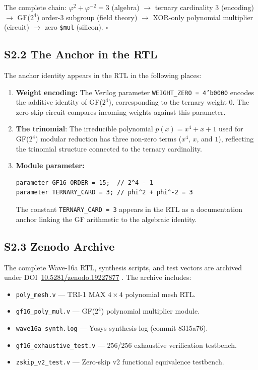 The complete chain: \(\varphi^{2}+\varphi^{-2}=3\) (algebra)
\(\to\) ternary cardinality 3 (encoding) \(\to\) GF(\(2^4\)) order-3 subgroup
(field theory) \(\to\) XOR-only polynomial multiplier (circuit)
\(\to\) zero \texttt{\$mul} (silicon). \(\square\)

\subsection{S2.2 The Anchor in the RTL}

The anchor identity appears in the RTL in the following places:

\begin{enumerate}
  \item \textbf{Weight encoding:} The Verilog parameter
        \texttt{WEIGHT\_ZERO = 4'b0000} encodes the additive identity
        of GF(\(2^4\)), corresponding to the ternary weight 0.
        The zero-skip circuit compares incoming weights against this parameter.

  \item \textbf{The trinomial}: The irreducible polynomial
        \(p(x) = x^4 + x + 1\) used for GF(\(2^4\)) modular reduction
        has three non-zero terms (\(x^4\), \(x\), and \(1\)), reflecting the
        trinomial structure connected to the ternary cardinality.

  \item \textbf{Module parameter:}
\begin{verbatim}
parameter GF16_ORDER = 15;  // 2^4 - 1
parameter TERNARY_CARD = 3; // phi^2 + phi^-2 = 3
\end{verbatim}
        The constant \texttt{TERNARY\_CARD = 3} appears in the RTL as a
        documentation anchor linking the GF arithmetic to the algebraic
        identity.
\end{enumerate}

\subsection{S2.3 Zenodo Archive}

The complete Wave-16a RTL, synthesis scripts, and test vectors are archived
under DOI~\href{https://doi.org/10.5281/zenodo.19227877}{10.5281/zenodo.19227877}
\cite{zenodo_19227877_phd}.
The archive includes:
\begin{itemize}
  \item \texttt{poly\_mesh.v} --- TRI-1 MAX \(4 \times 4\) polynomial mesh RTL.
  \item \texttt{gf16\_poly\_mul.v} --- GF(\(2^4\)) polynomial multiplier module.
  \item \texttt{wave16a\_synth.log} --- Yosys synthesis log (commit 8315a76).
  \item \texttt{gf16\_exhaustive\_test.v} --- 256/256 exhaustive verification testbench.
  \item \texttt{zskip\_v2\_test.v} --- Zero-skip v2 functional equivalence testbench.
\end{itemize}

